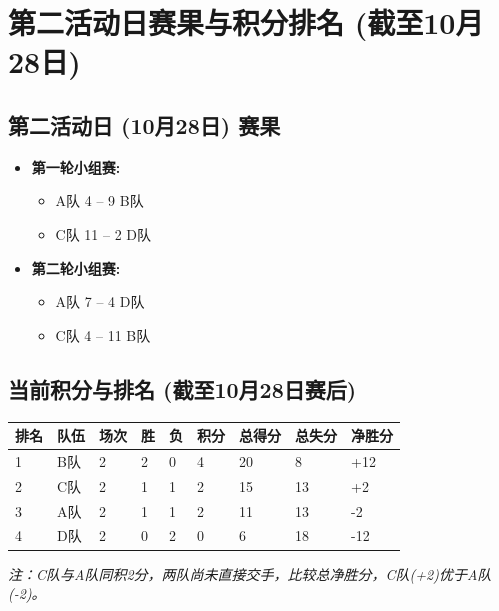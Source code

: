 \documentclass{ctexart}
\begin{document}
\newpage

\section{第二活动日赛果与积分排名 (截至10月28日)}

\subsection*{第二活动日 (10月28日) 赛果}
\begin{itemize}
    \item \textbf{第一轮小组赛:}
    \begin{itemize}
        \item A队 4 -- 9 B队
        \item C队 11 -- 2 D队
    \end{itemize}
    \item \textbf{第二轮小组赛:}
    \begin{itemize}
        \item A队 7 -- 4 D队
        \item C队 4 -- 11 B队
    \end{itemize}
\end{itemize}

\subsection*{当前积分与排名 (截至10月28日赛后)}
\renewcommand{\arraystretch}{1.3}
\begin{tabularx}{\textwidth}{@{} M{1.2cm} M{1.2cm} M{1cm} M{1cm} M{1cm} M{1.2cm} M{1.5cm} M{1.5cm} M{1.5cm} @{}}
    \toprule
    \textbf{排名} & \textbf{队伍} & \textbf{场次} & \textbf{胜} & \textbf{负} & \textbf{积分} & \textbf{总得分} & \textbf{总失分} & \textbf{净胜分} \\
     & B队 & 2 & 2 & 0 & 4 & 20 & 8 & +12 \\
    2 & C队 & 2 & 1 & 1 & 2 & 15 & 13 & +2 \\
    3 & A队 & 2 & 1 & 1 & 2 & 11 & 13 & -2 \\
    4 & D队 & 2 & 0 & 2 & 0 & 6 & 18 & -12 \\
    \bottomrule
\end{tabularx}
\renewcommand{\arraystretch}{1.0}
\vspace{0.5em}
\textit{注：C队与A队同积2分，两队尚未直接交手，比较总净胜分，C队(+2)优于A队(-2)。}

\newpage
\end{document}
